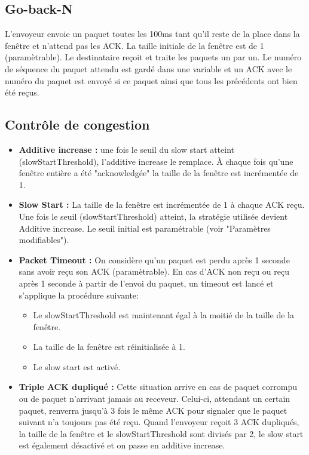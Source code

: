 \documentclass[]{article}
\begin{document}
\subsection{Go-back-N}
L'envoyeur envoie un paquet toutes les 100ms tant qu'il reste de la place dans la fenêtre et n'attend pas les ACK. La taille initiale de la fenêtre est de 1 (paramètrable). Le destinataire reçoit et traite les paquets un par un. Le numéro de séquence du paquet attendu est gardé dans une variable et un ACK avec le numéro du paquet est envoyé si ce paquet ainsi que tous les précédents ont bien été reçus.
\subsection{Contrôle de congestion}
\begin{itemize}
\item \textbf{Additive increase : }une fois le seuil du slow start atteint (slowStartThreshold), l'additive increase le remplace. À chaque fois qu'une fenêtre entière a été "acknowledgée" la taille de la fenêtre est incrémentée de 1.
\item \textbf{Slow Start : }La taille de la fenêtre est incrémentée de 1 à chaque ACK reçu. Une fois le seuil (slowStartThreshold) atteint, la stratégie utilisée devient Additive increase. Le seuil initial est paramétrable (voir "Paramètres modifiables").
\item \textbf{Packet Timeout : }On considère qu'un paquet est perdu après 1 seconde sans avoir reçu son ACK (paramètrable). En cas d'ACK non reçu ou reçu après 1 seconde à partir de l'envoi du paquet, un timeout est lancé et s'applique la procédure suivante:
\begin{itemize}
\item Le slowStartThreshold est maintenant égal à la moitié de la taille de la fenêtre. 
\item La taille de la fenêtre est réinitialisée à 1.
\item Le slow start est activé.
\end{itemize}
\item \textbf{Triple ACK dupliqué : }Cette situation arrive en cas de paquet corrompu ou de paquet n'arrivant jamais au receveur. Celui-ci, attendant un certain paquet, renverra jusqu'à 3 fois le même ACK pour signaler que le paquet suivant n'a toujours pas été reçu. Quand l'envoyeur reçoit 3 ACK dupliqués, la taille de la fenêtre et le slowStartThreshold sont divisés par 2, le slow start est également désactivé et on passe en additive increase.
\end{itemize}
\end{document}
